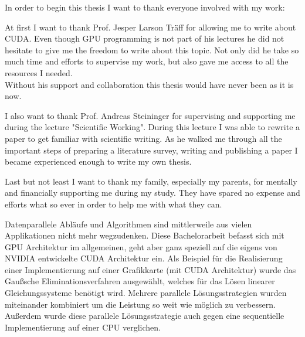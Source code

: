 \documentclass[draft, final]{vutinfth} %
\begin{document}
\frontmatter %

\addstatementpage



\begin{acknowledgements*}
	In order to begin this thesis I want to thank everyone involved with my work:

	At first I want to thank Prof. Jesper Larson Träff for allowing me to write about CUDA. Even though GPU programming is not part of his lectures he did not hesitate to give me the freedom to write about this topic. Not only did he take so much time and efforts to supervise my work, but also gave me access to all the resources I needed.\\
	Without his support and collaboration this thesis would have never been as it is now.

	I also want to thank Prof. Andreas Steininger for supervising and supporting me during the lecture "Scientific Working". During this lecture I was able to rewrite a paper to get familiar with scientific writing. As he walked me through all the important steps of preparing a literature survey, writing and publishing a paper I became experienced enough to write my own thesis.

	Last but not least I want to thank my family, especially my parents, for mentally and financially supporting me during my study. They have spared no expense and efforts what so ever in order to help me with what they can.

\end{acknowledgements*}

\begin{kurzfassung}
	Datenparallele Abläufe und Algorithmen sind mittlerweile aus vielen Applikationen nicht mehr wegzudenken. Diese Bachelorarbeit befasst sich mit GPU Architektur im allgemeinen, geht aber ganz speziell auf die eigens von NVIDIA entwickelte CUDA Architektur ein. Als Beispiel für die Realisierung einer Implementierung auf einer Grafikkarte (mit CUDA Architektur) wurde das Gaußsche Eliminationsverfahren ausgewählt, welches für das Lösen linearer Gleichungssysteme benötigt wird. Mehrere parallele Lösungsstrategien wurden miteinander kombiniert um die Leistung so weit wie möglich zu verbessern. Außerdem wurde diese parallele Lösungsstrategie auch gegen eine sequentielle Implementierung auf einer CPU verglichen.
\end{kurzfassung}
\end{document}
